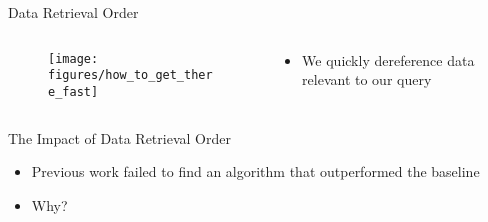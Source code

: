 \begin{frame}{Data Retrieval Order}
    \begin{columns}[T] %
        \begin{column}{.48\textwidth}

       \begin{figure}
            \centering
            \texttt{[image: figures/how\_to\_get\_there\_fast]}
        \end{figure}

        \end{column}%
        \hfill%
        \begin{column}{.48\textwidth}
            \bigskip
            \begin{itemize}
                \item We quickly dereference data relevant to our query
            \end{itemize}
        \end{column}%
    \end{columns}
\end{frame}


\begin{frame}{The Impact of Data Retrieval Order}
    \begin{itemize}
        \item Previous work \cite{hartig2016walking} failed to find an algorithm that outperformed the baseline
        \item Why?
    \end{itemize}
\end{frame}
